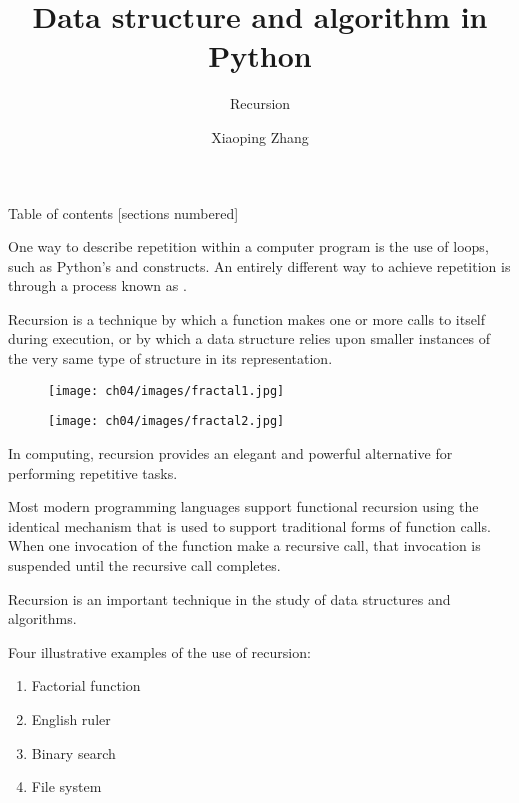 \documentclass[10pt]{beamer}
\title{Data structure and algorithm in Python}
\subtitle{Recursion}
\date{}%
\author{Xiaoping Zhang}
\institute{School of Mathematics and Statistics, Wuhan University}
\newcommand\Fontvi{\fontsize{6.5}{7.2}\selectfont}
\begin{document}
\maketitle

\begin{frame}{Table of contents}
  [sections numbered]
  \tableofcontents[hideallsubsections]
\end{frame}

\begin{frame}
  One way to describe repetition within a computer program is the use of loops, such as Python's  and  constructs. An entirely different way to achieve repetition is through a process known as .
\end{frame}

\begin{frame}
  \begin{defn}[Recusion]{}
    Recursion is a technique by which a function makes one or more calls to itself during execution, or by which a data structure relies upon smaller instances of the very same type of structure in its representation.
  \end{defn}
\end{frame}

\begin{frame}
  \begin{figure}
    \centering
    \texttt{[image: ch04/images/fractal1.jpg]}
  \end{figure}
\end{frame}

\begin{frame}
  \begin{figure}
    \centering
    \texttt{[image: ch04/images/fractal2.jpg]}
  \end{figure}
\end{frame}

\begin{frame}
  In computing, recursion provides an elegant and powerful alternative for performing repetitive tasks.


  Most modern programming languages support functional recursion using the identical mechanism that is used to support traditional forms of function calls. When one invocation of the function make a recursive call, that invocation is suspended until the recursive call completes.
\end{frame}

\begin{frame}
  Recursion is an important technique in the study of data structures and algorithms.


  Four illustrative examples of the use of recursion:
  \begin{enumerate}
  \item Factorial function
  \item English ruler
  \item Binary search
  \item File system
  \end{enumerate}
\end{frame}






% 
\end{document}
